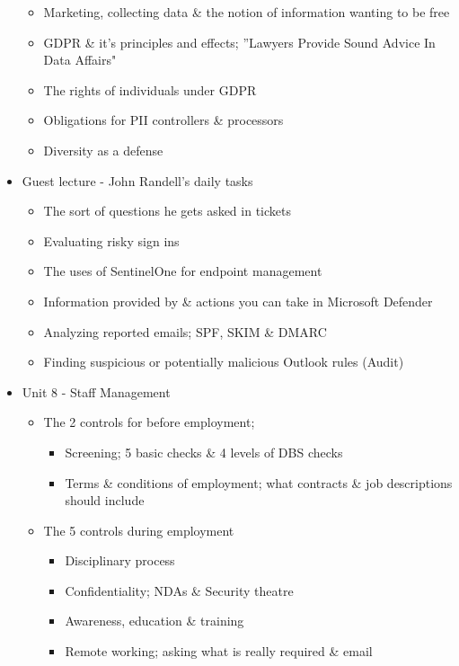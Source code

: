 \documentclass[tikz,border=10pt]{project_plan}
\begin{document}
\begin{itemize}
\begin{itemize}
          \item Marketing, collecting data \& the notion of information wanting to be free
          \item GDPR \& it's principles and effects; ”Lawyers Provide Sound Advice In Data Affairs"
          \item The rights of individuals under GDPR
          \item Obligations for PII controllers \& processors
          \item Diversity as a defense
        \end{itemize}
  \item Guest lecture - John Randell's daily tasks
        \begin{itemize}
          \item The sort of questions he gets asked in tickets
          \item Evaluating risky sign ins
          \item The uses of SentinelOne for endpoint management
          \item Information provided by \& actions you can take in Microsoft Defender
          \item Analyzing reported emails; SPF, SKIM \& DMARC
          \item Finding suspicious or potentially malicious Outlook rules (Audit)
        \end{itemize}
  \item Unit 8 - Staff Management
        \begin{itemize}
          \item The 2 controls for before employment;
                \begin{itemize}
                  \item Screening; 5 basic checks \& 4 levels of DBS checks
                  \item Terms \& conditions of employment; what contracts \& job descriptions should include
                \end{itemize}
          \item The 5 controls during employment
                \begin{itemize}
                  \item Disciplinary process
                  \item Confidentiality; NDAs \& Security theatre
                  \item Awareness, education \& training
                  \item Remote working; asking what is really required \& email

\end{itemize}
\end{itemize}
\end{itemize}
\end{document}

